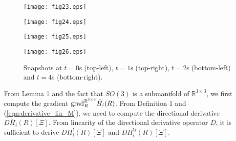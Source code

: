 \documentclass[conference,letterpaper]{ieeeconf}
\newcommand{\grad}{{\rm grad}}
\newcommand{\R}{{\mathbb R}}
\begin{document}
\begin{figure}[t]
\begin{center}
\begin{minipage}{4cm}
\begin{center}
\texttt{[image: fig23.eps]}
\end{center}
\end{minipage}
\hspace{.2cm}
\begin{minipage}{4cm}
\begin{center}
\texttt{[image: fig24.eps]}
\end{center}
\end{minipage}
\medskip

\begin{minipage}{4cm}
\begin{center}
\texttt{[image: fig25.eps]}
\end{center}
\end{minipage}
\hspace{.2cm}
\begin{minipage}{4cm}
\begin{center}
\texttt{[image: fig26.eps]}
\end{center}
\end{minipage}
\caption{Snapshots at $t=0$s (top-left), $t=1$s (top-right), $t=2$s (bottom-left) and $t = 4$s (bottom-right).}
\label{fig:snaps}
\end{center}
\end{figure}




From Lemma 1 and the fact that $SO(3)$
is a submanifold of $\R^{3\times 3}$,
we first compute the gradient $\grad_{R}^{\R^{3\times 3}} \bar H_i(R)$.
From Definition 1 and (\ref{eqn:derivative_lin_M}),
we need to compute the directional derivative
$D \bar H_i(R)[\Xi]$.
From linearity of the directional derivative operator $D$,
it is sufficient to derive 
$DH_i^l(R)[\Xi]$ and $DH_i^{lj}(R)[\Xi]$.
\end{document}
